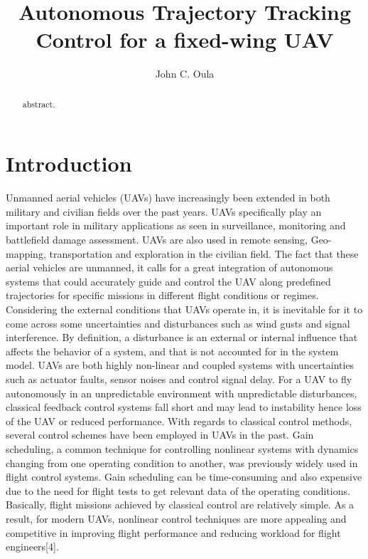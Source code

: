 \documentclass[12pt]{article}
\title{Autonomous Trajectory Tracking Control for a fixed-wing UAV}
\author{John C. Oula}
\begin{document}
\maketitle

\begin{abstract}
 abstract.
\end{abstract}

\tableofcontents

\section{Introduction}

Unmanned aerial vehicles (UAVs) have increasingly been extended in both military and civilian fields over the past years. UAVs specifically play an important role in military applications as seen in surveillance, monitoring and battlefield damage assessment. UAVs are also used in remote sensing, Geo-mapping, transportation and exploration in the civilian field. The fact that these aerial vehicles are unmanned, it calls for a great integration of autonomous systems that could accurately guide and control the UAV along predefined trajectories for specific missions in different flight conditions or regimes. Considering the external conditions that UAVs operate in, it is inevitable for it to come across some uncertainties and disturbances such as wind gusts and signal interference. By definition, a disturbance is an external or internal influence that affects the behavior of a system, and that is not accounted for in the system model. UAVs are both highly non-linear and coupled systems with uncertainties such as actuator faults, sensor noises and control signal delay. For a UAV to fly autonomously in an unpredictable environment with unpredictable disturbances, classical feedback control systems fall short and may lead to instability hence loss of the UAV or reduced performance. 
With regards to classical control methods, several control schemes have been employed in UAVs in the past. Gain scheduling, a common technique for controlling nonlinear systems with dynamics changing from one operating condition to another, was previously widely used in flight control systems. Gain scheduling can be time-consuming and also expensive due to the need for flight tests to get relevant data of the operating conditions. 
Basically, flight missions achieved by classical control are relatively simple. As a result, for modern UAVs, nonlinear control techniques are more appealing and competitive in improving flight performance and reducing workload for flight engineers[4].
\end{document}
